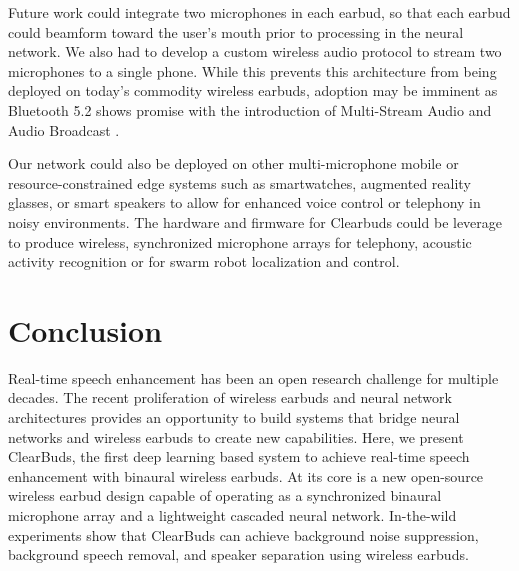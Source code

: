 \documentclass [11pt, proquest] {uwthesis}[2020/02/24]
\begin{document}
{Future work could integrate two microphones in each earbud, so that each earbud could beamform toward the user's mouth prior to processing in the neural network. We also had to develop a custom wireless audio protocol to stream two microphones to a single phone. While this prevents this architecture from being deployed on today's commodity wireless earbuds, adoption may be imminent as Bluetooth 5.2 shows promise with the introduction of Multi-Stream Audio and Audio Broadcast \cite{le-audio-faqs}.}


{Our network could also be deployed on other multi-microphone mobile or resource-constrained edge systems such as smartwatches, augmented reality glasses, or smart speakers to allow for enhanced voice control or telephony in noisy environments. The hardware and firmware for Clearbuds could be leverage to produce wireless, synchronized microphone arrays for telephony, acoustic activity recognition or for swarm robot localization and control.} 


\section{Conclusion}
Real-time speech enhancement has been an open research challenge for multiple decades. The recent proliferation of wireless earbuds and  neural network architectures provides an opportunity to build  systems that bridge neural networks and wireless earbuds to create new capabilities. Here, we present ClearBuds, the first deep learning based system to achieve real-time speech enhancement with binaural wireless earbuds. At its core is a new open-source wireless earbud design capable of operating as a synchronized binaural microphone array and a lightweight cascaded neural network. In-the-wild  experiments show that ClearBuds can achieve background noise suppression, background speech removal, and speaker separation using wireless earbuds. 





 
 
 

\end{document}
